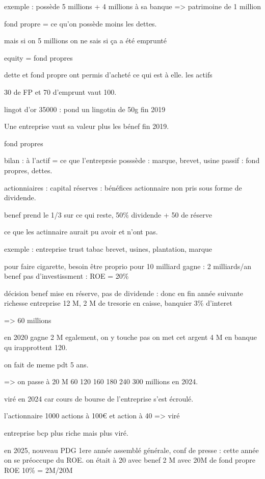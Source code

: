 \documentclass[a4paper,12pt]{article}
\begin{document}
exemple : possède  5 millions + 4 millions à sa banque
=> patrimoine de 1 million

fond propre = ce qu'on possède moins les dettes.

mais si on 5 millions on ne sais si ça a été emprunté

equity = fond propres

dette et fond propre ont permis d'acheté ce qui est à elle. les actifs

30 de FP et 70 d'emprunt vaut 100.

lingot d'or 35000 : pond un lingotin de 50g fin 2019

Une entreprise vaut sa valeur plus les bénef fin 2019.

fond propres


bilan : à l'actif = ce que l'entreprsie posssède : marque, brevet, usine
passif : fond propres, dettes.

actionniaires : capital
réserves : bénéfices actionnaire non pris sous forme de dividende.

benef prend le 1/3 sur ce qui reste, 50\% dividende + 50 de réserve

ce que les actinnaire aurait pu avoir et n'ont pas.

exemple : entreprise trust tabac
brevet, usines, plantation, marque

pour faire cigarette, besoin être proprio pour 10 milliard
gagne : 2 milliards/an benef
pas d'investissment : ROE = 20\%


décision benef mise en réserve, pas de dividende : donc en fin année suivante richesse
entreprise 12 M, 2 M de tresorie en caisse, banquier 3\% d'interet

=> 60 millions 

en 2020 gagne 2 M egalement, on y touche pas 
on met cet argent  4 M en banque qu irapprottent 120.

on fait de meme pdt 5 ans.

=> on passe à 20 M 60 120 160 180 240 300 millions en 2024.

viré en 2024 car cours de bourse de l'entreprise s'est écroulé.

l'actionnaire 1000 actions à 100€ et action à 40 => viré

entreprise bcp plus riche mais plus viré.

en 2025, nouveau PDG 1ere année
assemblé générale, conf de presse : cette année on se préoccupe du ROE.
on était à 20  avec benef 2 M avec 20M de fond propre  ROE 10\% = 2M/20M
\end{document}
